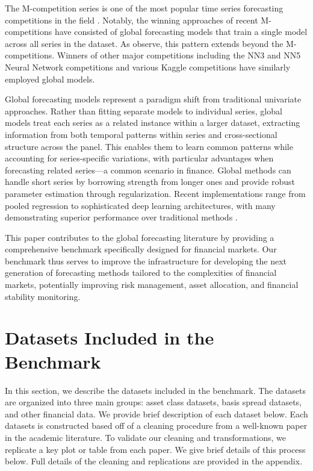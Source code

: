\documentclass{article}
\begin{document}
The M-competition series is one of the most popular time series forecasting competitions in the field \citep{Makridakis1982, Makridakis2000, Makridakis2018, Makridakis2022}. Notably, the winning approaches of recent M-competitions have consisted of global forecasting models that train a single model across all series in the dataset. As \citet{Godahewa2021} observe, this pattern extends beyond the M-competitions. Winners of other major competitions including the NN3 and NN5 Neural Network competitions and various Kaggle competitions have similarly employed global models.

Global forecasting models represent a paradigm shift from traditional univariate approaches. Rather than fitting separate models to individual series, global models treat each series as a related instance within a larger dataset, extracting information from both temporal patterns within series and cross-sectional structure across the panel. This enables them to learn common patterns while accounting for series-specific variations, with particular advantages when forecasting related series—a common scenario in finance. Global methods can handle short series by borrowing strength from longer ones and provide robust parameter estimation through regularization. Recent implementations range from pooled regression to sophisticated deep learning architectures, with many demonstrating superior performance over traditional methods \citep{Godahewa2021}.

This paper contributes to the global forecasting literature by providing a comprehensive benchmark specifically designed for financial markets.
Our benchmark thus serves to improve the infrastructure for developing the next generation of forecasting methods tailored to the complexities of financial markets, potentially improving risk management, asset allocation, and financial stability monitoring.



\section{Datasets Included in the Benchmark}

In this section, we describe the datasets included in the benchmark. The datasets are organized into three main groups: asset class datasets, basis spread datasets, and other financial data. We provide brief description of each dataset below. Each datasets is constructed based off of a cleaning procedure from a well-known paper in the academic literature. To validate our cleaning and transformations, we replicate a key plot or table from each paper. We give brief details of this process below. Full details of the cleaning and replications are provided in the appendix.
\end{document}
